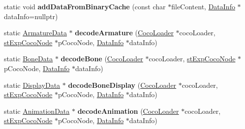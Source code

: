 \begin{DoxyCompactItemize}
\item 
\mbox{\label{classcocostudio_1_1DataReaderHelper_ac1cc14255bcae767c06c1b01d8942dd6}} 
static void {\bfseries add\+Data\+From\+Binary\+Cache} (const char $\ast$file\+Content, \hyperlink{structcocostudio_1_1DataReaderHelper_1_1__DataInfo}{Data\+Info} $\ast$data\+Info=nullptr)
\item 
\mbox{\label{classcocostudio_1_1DataReaderHelper_a447e5023814aa631cc663a069284585d}} 
static \hyperlink{classcocostudio_1_1ArmatureData}{Armature\+Data} $\ast$ {\bfseries decode\+Armature} (\hyperlink{classcocostudio_1_1CocoLoader}{Coco\+Loader} $\ast$coco\+Loader, \hyperlink{structcocostudio_1_1stExpCocoNode}{st\+Exp\+Coco\+Node} $\ast$p\+Coco\+Node, \hyperlink{structcocostudio_1_1DataReaderHelper_1_1__DataInfo}{Data\+Info} $\ast$data\+Info)
\item 
\mbox{\label{classcocostudio_1_1DataReaderHelper_abccd9a044b37049df70771a861aed01a}} 
static \hyperlink{classcocostudio_1_1BoneData}{Bone\+Data} $\ast$ {\bfseries decode\+Bone} (\hyperlink{classcocostudio_1_1CocoLoader}{Coco\+Loader} $\ast$coco\+Loader, \hyperlink{structcocostudio_1_1stExpCocoNode}{st\+Exp\+Coco\+Node} $\ast$p\+Coco\+Node, \hyperlink{structcocostudio_1_1DataReaderHelper_1_1__DataInfo}{Data\+Info} $\ast$data\+Info)
\item 
\mbox{\label{classcocostudio_1_1DataReaderHelper_aab0f48e4ef9f2d57e1c68edd105410bd}} 
static \hyperlink{classcocostudio_1_1DisplayData}{Display\+Data} $\ast$ {\bfseries decode\+Bone\+Display} (\hyperlink{classcocostudio_1_1CocoLoader}{Coco\+Loader} $\ast$coco\+Loader, \hyperlink{structcocostudio_1_1stExpCocoNode}{st\+Exp\+Coco\+Node} $\ast$p\+Coco\+Node, \hyperlink{structcocostudio_1_1DataReaderHelper_1_1__DataInfo}{Data\+Info} $\ast$data\+Info)
\item 
\mbox{\label{classcocostudio_1_1DataReaderHelper_aadb6ad459cecbb81c6b657244143c76d}} 
static \hyperlink{classcocostudio_1_1AnimationData}{Animation\+Data} $\ast$ {\bfseries decode\+Animation} (\hyperlink{classcocostudio_1_1CocoLoader}{Coco\+Loader} $\ast$coco\+Loader, \hyperlink{structcocostudio_1_1stExpCocoNode}{st\+Exp\+Coco\+Node} $\ast$p\+Coco\+Node, \hyperlink{structcocostudio_1_1DataReaderHelper_1_1__DataInfo}{Data\+Info} $\ast$data\+Info)

\end{DoxyCompactItemize}

